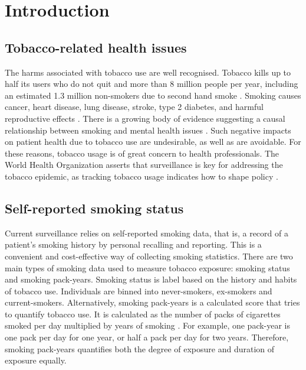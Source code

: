 \documentclass{article} %
\begin{document}
\newpage
\tableofcontents

\listoffigures
\listoftables
\listofequations
\listofdiagrams

\newpage
{}

\section{Introduction}
\subsection{Tobacco-related health issues}
The harms associated with tobacco use are well recognised. Tobacco kills up to half its users who do not quit and more than 8 million people per year, including an estimated 1.3 million non-smokers due to second hand smoke \cite{who_tobacco}. Smoking causes cancer, heart disease, lung disease, stroke, type 2 diabetes, and harmful reproductive effects \cite{hhs_smoking_2014}. There is a growing body of evidence suggesting a causal relationship between smoking and mental health issues \cite{taylor2019smoking}. Such negative impacts on patient health due to tobacco use are undesirable, as well as are avoidable. For these reasons, tobacco usage is of great concern to health professionals. The World Health Organization asserts that surveillance is key for addressing the tobacco epidemic, as tracking tobacco usage indicates how to shape policy \cite{who_tobacco}.

\subsection{Self-reported smoking status} \label{sec:srss}
Current surveillance relies on self-reported smoking data, that is, a record of a patient's smoking history by personal recalling and reporting. This is a convenient and cost-effective way of collecting smoking statistics. There are two main types of smoking data used to measure tobacco exposure: smoking status and smoking pack-years. Smoking status is label based on the history and habits of tobacco use. Individuals are binned into never-smokers, ex-smokers and current-smokers. Alternatively, smoking pack-years is a calculated score that tries to quantify tobacco use. It is calculated as the number of packs of cigarettes smoked per day multiplied by years of smoking \cite{smokingpackyears}. For example, one pack-year is one pack per day for one year, or half a pack per day for two years. Therefore, smoking pack-years quantifies both the degree of exposure and duration of exposure equally.
\end{document}
